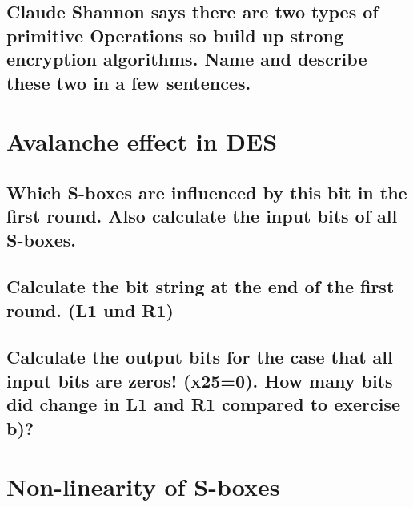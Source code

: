 \subsection{Claude Shannon says there are two types of primitive Operations so build up strong encryption algorithms. Name and describe these two in a few sentences.}
\label{section:2c}

\section{Avalanche effect in DES}

\begin{comment}
For a good block cipher it is important that a small change in the input bits results in a great change
in the output bits( This effect is called avalanche effect). In the following we will try to evaluate this
effect in DES. For this we use an input string with an one at the 19th position(x25 = 1). All other
Bits are set to zeros. The 56 bits of the key also are set to zero(this means all the round keys are zero.
Remember that the input bit string first runs through the initial permutation!)
\end{comment}

\subsection{Which S-boxes are influenced by this bit in the first round. Also calculate the input bits of all S-boxes.}
\label{section:3a}

\subsection{Calculate the bit string at the end of the first round. (L1 und R1)}
\label{section:3b}

\subsection{Calculate the output bits for the case that all input bits are zeros! (x25=0). How many bits did change in L1 and R1 compared to exercise b)?}
\label{section:3c}


\section{Non-linearity of S-boxes}

\begin{comment}
An important property of DES is the non-linearity of the S-boxes. In this exercise we want to verify
this property by comparing the output bits for different input bits in a specific S-box S i. Show that for
S 5 the following computation rule can be applied: 2
S i(x1) bXOR S i(x2) , S i(x1 bXOR x2):
"bXOR" is called a bitwise XOR.
\end{comment}

